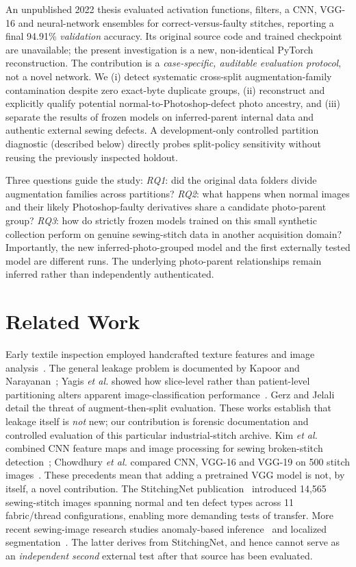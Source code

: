 \documentclass[conference,a4paper]{IEEEtran}
\begin{document}
An unpublished 2022 thesis evaluated activation functions, filters, a CNN, VGG-16 and neural-network ensembles for correct-versus-faulty stitches, reporting a final 94.91\% \emph{validation} accuracy. Its original source code and trained checkpoint are unavailable; the present investigation is a new, non-identical PyTorch reconstruction. The contribution is a \emph{case-specific, auditable evaluation protocol}, not a novel network. We (i) detect systematic cross-split augmentation-family contamination despite zero exact-byte duplicate groups, (ii) reconstruct and explicitly qualify potential normal-to-Photoshop-defect photo ancestry, and (iii) separate the results of frozen models on inferred-parent internal data and authentic external sewing defects. A development-only controlled partition diagnostic (described below) directly probes split-policy sensitivity without reusing the previously inspected holdout.

Three questions guide the study: \emph{RQ1}: did the original data folders divide augmentation families across partitions? \emph{RQ2}: what happens when normal images and their likely Photoshop-faulty derivatives share a candidate photo-parent group? \emph{RQ3}: how do strictly frozen models trained on this small synthetic collection perform on genuine sewing-stitch data in another acquisition domain? Importantly, the new inferred-photo-grouped model and the first externally tested model are different runs. The underlying photo-parent relationships remain inferred rather than independently authenticated.

\section{Related Work}
Early textile inspection employed handcrafted texture features and image analysis~\cite{ngan}. The general leakage problem is documented by Kapoor and Narayanan~\cite{kapoor}; Yagis \emph{et al.} showed how slice-level rather than patient-level partitioning alters apparent image-classification performance~\cite{yagis}. Gerz and Jelali~\cite{gerz} detail the threat of augment-then-split evaluation. These works establish that leakage itself is \emph{not} new; our contribution is forensic documentation and controlled evaluation of this particular industrial-stitch archive. Kim \emph{et al.} combined CNN feature maps and image processing for sewing broken-stitch detection~\cite{kim}; Chowdhury \emph{et al.} compared CNN, VGG-16 and VGG-19 on 500 stitch images~\cite{chowdhury}. These precedents mean that adding a pretrained VGG model is not, by itself, a novel contribution. The StitchingNet publication~\cite{stitchingnet} introduced 14,565 sewing-stitch images spanning normal and ten defect types across 11 fabric/thread configurations, enabling more demanding tests of transfer. More recent sewing-image research studies anomaly-based inference~\cite{patchcore2026} and localized segmentation~\cite{stitchingnetseg2026}. The latter derives from StitchingNet, and hence cannot serve as an \emph{independent second} external test after that source has been evaluated.
\end{document}
